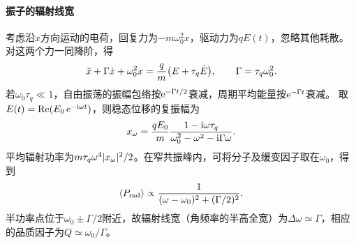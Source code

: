 \paragraph{振子的辐射线宽}
考虑沿$x$方向运动的电荷，回复力为$-m\omega_0^2x$，驱动力为$qE(t)$，忽略其他耗散。对这两个力一同降阶，得
\[
    \ddot x + \Gamma\dot x + \omega_0^2x = \frac qm\bigl(E + \tau_q\dot E\bigr),
    \qquad \Gamma = \tau_q\omega_0^2.
\]
若$\omega_0\tau_q \ll 1$，自由振荡的振幅包络按$\mathop{}\!\mathrm{e}^{-\Gamma t/2}$衰减，周期平均能量按$\mathop{}\!\mathrm{e}^{-\Gamma t}$衰减。
取$E(t) = \operatorname{Re}(E_0\mathop{}\!\mathrm{e}^{-\mathrm{i}\omega t})$，则稳态位移的复振幅为
\[
    x_\omega = \frac{qE_0}{m}\frac{1 - \mathrm{i}\omega\tau_q}{\omega_0^2 - \omega^2 - \mathrm{i}\Gamma\omega}.
\]
平均辐射功率为$m\tau_q\omega^4\lvert x_\omega\rvert^2/2$。在窄共振峰内，可将分子及缓变因子取在$\omega_0$，得到
\begin{equation}
    \label{eq:ed-radiative-linewidth}
    \langle P_{\mathrm{rad}}\rangle \propto
    \frac{1}{(\omega - \omega_0)^2 + (\Gamma/2)^2}.
\end{equation}
半功率点位于$\omega_0 \pm \Gamma/2$附近，故辐射线宽（角频率的半高全宽）为$\Delta\omega \simeq \Gamma$，相应的品质因子为$Q \simeq \omega_0/\Gamma$。
